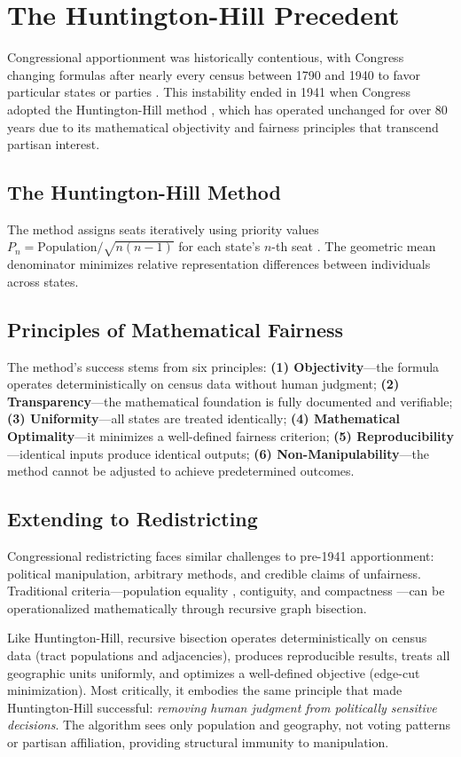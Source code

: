 \section{The Huntington-Hill Precedent}
\label{sec:huntington}

Congressional apportionment was historically contentious, with Congress changing formulas after nearly every census between 1790 and 1940 to favor particular states or parties \cite{balinski1982fair}. This instability ended in 1941 when Congress adopted the Huntington-Hill method \cite{huntington1928method}, which has operated unchanged for over 80 years due to its mathematical objectivity and fairness principles that transcend partisan interest.

\subsection{The Huntington-Hill Method}

The method assigns seats iteratively using priority values $P_n = \text{Population}/\sqrt{n(n-1)}$ for each state's $n$-th seat \cite{census2020apportionment}. The geometric mean denominator minimizes relative representation differences between individuals across states.

\subsection{Principles of Mathematical Fairness}

The method's success stems from six principles: \textbf{(1) Objectivity}—the formula operates deterministically on census data without human judgment; \textbf{(2) Transparency}—the mathematical foundation is fully documented and verifiable; \textbf{(3) Uniformity}—all states are treated identically; \textbf{(4) Mathematical Optimality}—it minimizes a well-defined fairness criterion; \textbf{(5) Reproducibility}—identical inputs produce identical outputs; \textbf{(6) Non-Manipulability}—the method cannot be adjusted to achieve predetermined outcomes.

\subsection{Extending to Redistricting}

Congressional redistricting faces similar challenges to pre-1941 apportionment: political manipulation, arbitrary methods, and credible claims of unfairness. Traditional criteria—population equality \cite{reynolds1964}, contiguity, and compactness \cite{polsby1991third}—can be operationalized mathematically through recursive graph bisection.

Like Huntington-Hill, recursive bisection operates deterministically on census data (tract populations and adjacencies), produces reproducible results, treats all geographic units uniformly, and optimizes a well-defined objective (edge-cut minimization). Most critically, it embodies the same principle that made Huntington-Hill successful: \textit{removing human judgment from politically sensitive decisions}. The algorithm sees only population and geography, not voting patterns or partisan affiliation, providing structural immunity to manipulation.

